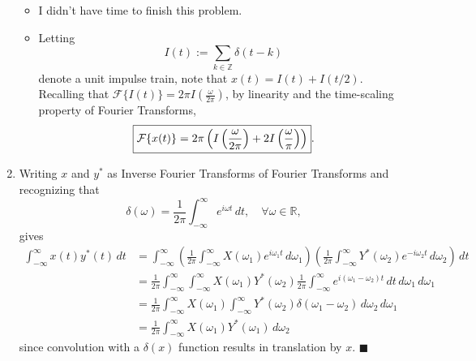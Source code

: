 \documentclass[11pt]{article}
\renewcommand{\qed}{\quad $\blacksquare$}
\newcommand{\Z}{\mathbb{Z}} %
\newcommand{\Ft}{\mathcal{F}} %
\newcommand{\R}{\mathbb{R}} %
\begin{document}
\begin{enumerate}
\begin{itemize}
\item I didn't have time to finish this problem.

\item Letting
\[I(t) := \sum_{k \in \Z} \delta(t - k)\]
denote a unit impulse train, note that $x(t) = I(t) + I(t/2)$. Recalling that
$\Ft \{ I(t) \} = 2\pi I \left( \frac{\omega}{2\pi} \right)$, by linearity and
the time-scaling property of Fourier Transforms,
\[\mbox{\fbox{$\displaystyle \Ft \{ x(t) \}
    = 2\pi \left( I \left( \frac{\omega}{2\pi} \right)
    + 2 I \left( \frac{\omega}{\pi} \right) \right)$}}
.\]
\end{itemize}

\item Writing $x$ and $y^*$ as Inverse Fourier Transforms of Fourier Transforms
and recognizing that
\[\delta(\omega) = \frac{1}{2\pi} \int_{-\infty}^\infty e^{i\omega t} \, dt,
    \quad \forall \omega \in \R,\]
gives
\begin{align*}
\int_{-\infty}^\infty x(t)y^*(t) \, dt
 & = \int_{-\infty}^\infty
    \left( \frac{1}{2\pi} \int_{-\infty}^\infty X(\omega_1)e^{i\omega_1 t} \, d\omega_1 \right)
    \left( \frac{1}{2\pi} \int_{-\infty}^\infty Y^*(\omega_2)e^{-i\omega_2 t} \, d\omega_2 \right)
        \, dt   \\
 & = \frac{1}{2\pi} \int_{-\infty}^\infty \int_{-\infty}^\infty X(\omega_1)Y^*(\omega_2)
     \frac{1}{2\pi} \int_{-\infty}^\infty e^{i(\omega_1 - \omega_2) t} \, dt
        \, d\omega_1 \, d\omega_1   \\
 & = \frac{1}{2\pi} \int_{-\infty}^\infty X(\omega_1) \int_{-\infty}^\infty Y^*(\omega_2)
     \delta(\omega_1 - \omega_2)    \, d\omega_2 \, d\omega_1   \\
 & = \frac{1}{2\pi} \int_{-\infty}^\infty X(\omega_1)Y^*(\omega_1)
     \, d\omega_2
\end{align*}
since convolution with a $\delta(x)$ function results in translation by $x$.
\qed
\end{enumerate}
\end{document}
